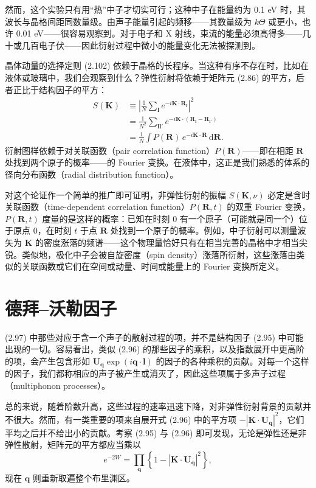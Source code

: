 然而，这个实验只有用“热”中子才切实可行；这种中子在能量约为 0.1 eV 时，其波长与晶格间距同数量级。由声子能量引起的频移——其数量级为 $k\Theta$ 或更小，也许 0.01 eV——很容易观察到。对于电子和 X 射线，束流的能量必须高得多——几十或几百电子伏——因此衍射过程中微小的能量变化无法被探测到。

晶体动量的选择定则 (2.102) 依赖于晶格的长程序。当这种有序不存在时，比如在液体或玻璃中，我们会观察到什么？弹性衍射将依赖于矩阵元 (2.86) 的平方，后者正比于结构因子的平方：
\begin{align*}
S(\mathbf{K}) &\equiv \left|\frac{1}{N}\sum_{\mathbf{l}} e^{-i\mathbf{K}\cdot\mathbf{R}_{\mathbf{l}}}\right|^{2}\\
&= \frac{1}{N^{2}}\sum_{\mathbf{l}\mathbf{l}'} e^{-i\mathbf{K}\cdot(\mathbf{R}_{\mathbf{l}}-\mathbf{R}_{\mathbf{l}'})}\\
&= \frac{1}{N}\int P(\mathbf{R})\,e^{-i\mathbf{K}\cdot\mathbf{R}}\,\mathrm{d}\mathbf{R}.
\tag{2.103}
\end{align*}
衍射图样依赖于对关联函数（pair correlation function）$P(\mathbf{R})$——即在相距 $\mathbf{R}$ 处找到两个原子的概率——的 Fourier 变换。在液体中，这正是我们熟悉的体系的径向分布函数（radial distribution function）。

对这个论证作一个简单的推广即可证明，非弹性衍射的振幅 $S(\mathbf{K},\nu)$ 必定是含时关联函数（time-dependent correlation function）$P(\mathbf{R},t)$ 的双重 Fourier 变换，$P(\mathbf{R},t)$ 度量的是这样的概率：已知在时刻 0 有一个原子（可能就是同一个）位于原点 0，在时刻 $t$ 于点 $\mathbf{R}$ 处找到一个原子的概率。例如，中子衍射可以测量波矢为 $\mathbf{K}$ 的密度涨落的频谱——这个物理量恰好只有在相当完善的晶格中才相当尖锐。类似地，极化中子会被自旋密度（spin density）涨落所衍射，这些涨落由类似的关联函数或它们在空间或动量、时间或能量上的 Fourier 变换所定义。

\section{德拜–沃勒因子}

(2.97) 中那些对应于含一个声子的散射过程的项，并不是结构因子 (2.95) 中可能出现的一切。容易看出，类似 (2.96) 的那些因子的乘积，以及指数展开中更高阶的项，会产生包含形如 $\mathbf{U}_{\mathbf{q}}\exp(i\mathbf{q}\cdot\mathbf{l})$ 的因子的各种乘积的贡献。对每一个这样的因子，我们都称相应的声子被产生或消灭了，因此这些项属于多声子过程（multiphonon processes）。

总的来说，随着阶数升高，这些过程的速率迅速下降，对非弹性衍射背景的贡献并不很大。然而，有一类重要的项来自展开式 (2.96) 中的平方项 $-|\mathbf{K}\cdot\mathbf{U}_{\mathbf{q}}|^{2}$，它们平均之后并不给出小的贡献。考察 (2.95) 与 (2.96) 即可发现，无论是弹性还是非弹性散射，矩阵元的平方都应当乘以
\begin{equation*}
e^{-2W}=\prod_{\mathbf{q}}\left\{1-|\mathbf{K}\cdot\mathbf{U}_{\mathbf{q}}|^{2}\right\},
\tag{2.104}
\end{equation*}
现在 $\mathbf{q}$ 则重新取遍整个布里渊区。


